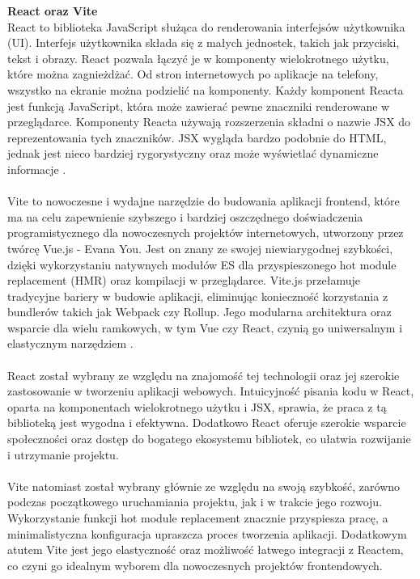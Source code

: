 \documentclass[twoside]{projektInzynierskiMS1}
\begin{document}
\noindent \textbf{React oraz Vite}\\
React to biblioteka JavaScript służąca do renderowania interfejsów użytkownika (UI). Interfejs użytkownika składa się z małych jednostek, takich jak przyciski, tekst i obrazy. React pozwala łączyć je w komponenty wielokrotnego użytku, które można zagnieżdżać. Od stron internetowych po aplikacje na telefony, wszystko na ekranie można podzielić na komponenty. Każdy komponent Reacta jest funkcją JavaScript, która może zawierać pewne znaczniki renderowane w przeglądarce. Komponenty Reacta używają rozszerzenia składni o nazwie JSX do reprezentowania tych znaczników. JSX wygląda bardzo podobnie do HTML, jednak jest nieco bardziej rygorystyczny oraz może wyświetlać dynamiczne informacje \cite{React}.
\\\\
Vite to nowoczesne i wydajne  narzędzie do budowania aplikacji frontend, które ma na celu zapewnienie szybszego i bardziej oszczędnego doświadczenia programistycznego dla nowoczesnych projektów internetowych, utworzony przez twórcę Vue.js - Evana You. Jest on znany ze swojej niewiarygodnej szybkości, dzięki wykorzystaniu natywnych modułów ES dla przyspieszonego hot module replacement (HMR) oraz kompilacji w przeglądarce. Vite.js przełamuje tradycyjne bariery w budowie aplikacji, eliminując konieczność korzystania z bundlerów takich jak Webpack czy Rollup. Jego modularna architektura oraz wsparcie dla wielu ramkowych, w tym Vue czy React, czynią go uniwersalnym i elastycznym narzędziem \cite{ViteGuide}.
\\\\
React został wybrany ze względu na znajomość tej technologii oraz jej szerokie zastosowanie w tworzeniu aplikacji webowych. Intuicyjność pisania kodu w React, oparta na komponentach wielokrotnego użytku i JSX, sprawia, że praca z tą biblioteką jest wygodna i efektywna. Dodatkowo React oferuje szerokie wsparcie społeczności oraz dostęp do bogatego ekosystemu bibliotek, co ułatwia rozwijanie i utrzymanie projektu.
\\\\
Vite natomiast został wybrany głównie ze względu na swoją szybkość, zarówno podczas początkowego uruchamiania projektu, jak i w trakcie jego rozwoju. Wykorzystanie funkcji hot module replacement znacznie przyspiesza pracę, a minimalistyczna konfiguracja upraszcza proces tworzenia aplikacji. Dodatkowym atutem Vite jest jego elastyczność oraz możliwość łatwego integracji z Reactem, co czyni go idealnym wyborem dla nowoczesnych projektów frontendowych.
\\\\
\end{document}
